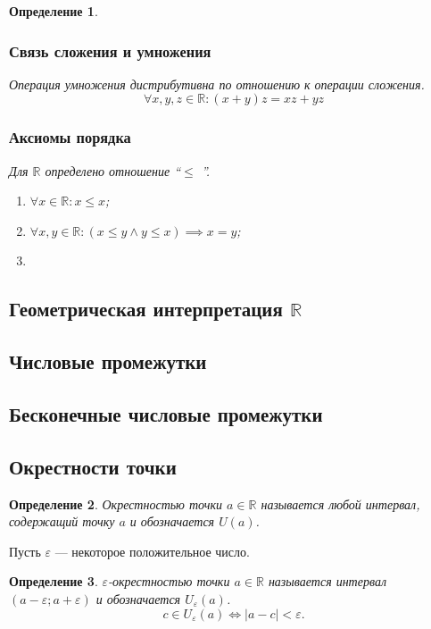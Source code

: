 \documentclass[a4paper,12pt]{article} %
\newtheorem{definition}{Определение}[section]
\theoremstyle{remark}
\theoremstyle{definition}
\begin{document}
\begin{definition}
	\subsubsection*{Связь сложения и умножения}
	Операция умножения дистрибутивна по отношению к операции сложения.
		$$\forall x, y, z\in \mathbb{R}:(x+y)z=xz+yz$$
	\subsubsection*{Аксиомы порядка}
	Для $\mathbb{R}$ определено отношение ``$\le $ ''.
		\begin{enumerate}
			\item $\forall x\in \mathbb{R}:x\le x$;
			\item $\forall x, y\in \mathbb{R}:(x\le y \land y\le x)\implies x=y$;
			\item
		\end{enumerate}
	
\end{definition}

\subsection{Геометрическая интерпретация $\mathbb{R}$}
\subsection{Числовые промежутки}
\subsection{Бесконечные числовые промежутки}



\subsection{Окрестности точки}
\begin{definition}
	Окрестностью точки $a \in \mathbb{R}$ называется любой интервал, содержащий точку $a$ и обозначается $U(a)$.
\end{definition}

Пусть $\varepsilon$ --- некоторое положительное число.
\begin{definition}
	$\varepsilon$-окрестностью точки $a\in \mathbb{R}$ называется интервал $(a-\varepsilon;a+\varepsilon)$ и обозначается $U_\varepsilon(a)$.
	\[
	c\in U_\varepsilon(a) \iff |a-c| < \varepsilon
	.\] 
\end{definition}
\end{document}
